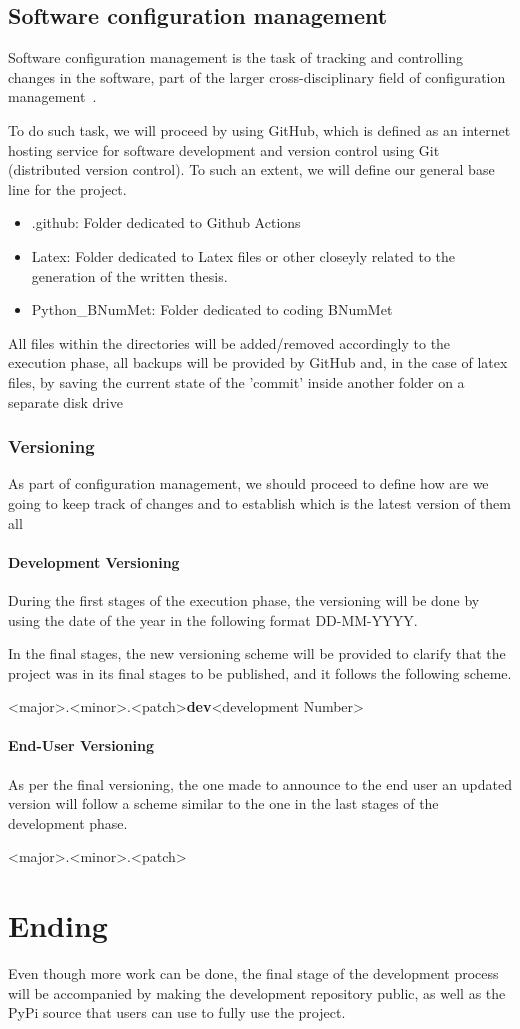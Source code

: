 \subsection{Software configuration management}
Software configuration management is the task of tracking and controlling changes in the software, part of the larger cross-disciplinary field of configuration management~\cite{Pre94}.

To do such task, we will proceed by using GitHub, which is defined as an internet hosting service for software development and version control using Git (distributed version control). To such an extent, we will define our general base line for the project.
\begin{itemize}
    \item .github: Folder dedicated to Github Actions
    \item Latex: Folder dedicated to Latex files or other closeyly related to the generation of the written thesis.
    \item Python\_BNumMet: Folder dedicated to coding BNumMet
\end{itemize}

All files within the directories will be added/removed accordingly to the execution phase, all backups will be provided by GitHub and, in the case of latex files, by saving the current state of the 'commit' inside another folder on a separate disk drive
\subsubsection{Versioning}
As part of configuration management, we should proceed to define how are we going to keep track of changes and to establish which is the latest version of them all
\paragraph{Development Versioning}
During the first stages of the execution phase, the versioning will be done by using the date of the year in the following format DD-MM-YYYY.

In the final stages, the new versioning scheme will be provided to clarify that the project was in its final stages to be published, and it follows the following scheme.
\begin{center}
    <major>.<minor>.<patch>\textbf{dev}<development Number>
\end{center}
\paragraph{End-User Versioning}
As per the final versioning, the one made to announce to the end user an updated version will follow a scheme similar to the one in the last stages of the development phase.
\begin{center}
    <major>.<minor>.<patch>
\end{center}



\section{Ending}
Even though more work can be done, the final stage of the development process will be accompanied by making the development repository public, as well as the PyPi source that users can use to fully use the project. 

